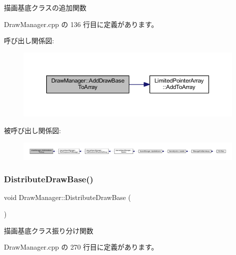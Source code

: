 描画基底クラスの追加関数 



 Draw\+Manager.\+cpp の 136 行目に定義があります。

呼び出し関係図\+:\nopagebreak
\begin{figure}[H]
\begin{center}
\leavevmode
\includegraphics[width=350pt]{class_draw_manager_a9dbd645fdbf927cd43d400335ff9b286_cgraph}
\end{center}
\end{figure}
被呼び出し関係図\+:
\nopagebreak
\begin{figure}[H]
\begin{center}
\leavevmode
\includegraphics[width=350pt]{class_draw_manager_a9dbd645fdbf927cd43d400335ff9b286_icgraph}
\end{center}
\end{figure}
\mbox{\label{class_draw_manager_a9a09cb524187bc11f1e4812a06fe46d6}} 
\subsubsection{\texorpdfstring{Distribute\+Draw\+Base()}{DistributeDrawBase()}}
{\footnotesize\ttfamily void Draw\+Manager\+::\+Distribute\+Draw\+Base (\begin{DoxyParamCaption}{ }\end{DoxyParamCaption})\hspace{0.3cm}{\ttfamily [private]}}



描画基底クラス振り分け関数 



 Draw\+Manager.\+cpp の 270 行目に定義があります。

